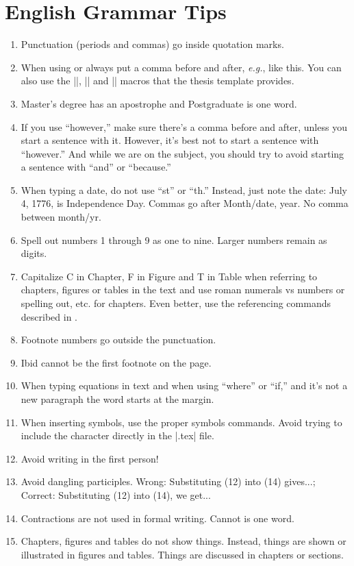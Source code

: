\section{English Grammar Tips}
\begin{enumerate}
\item Punctuation (periods and commas) go inside quotation marks. 
\item When using \ie \eg or \etc always put
  a comma before and after, \emph{e.g.}, like this. You can also use
  the |\ie|, |\eg| and |\etc| macros that the thesis template provides.
\item Master's degree has an apostrophe and Postgraduate is one word. 
\item If you use ``however,'' make sure there's a comma before and after,
  unless you start a sentence with it. However, it's best not to start a sentence
  with ``however.'' And while we are on the subject, you should try to avoid 
  starting a sentence with ``and'' or ``because.'' 
\item When typing a date, do not use ``st'' or ``th.'' Instead, just
  note the date: July 4, 1776, is Independence Day. Commas go 
  after Month/date, year. No comma between month/yr. 
\item Spell out numbers 1 through 9 as one to nine.  Larger numbers remain as digits.  
\item Capitalize C in Chapter, F in Figure and T in Table when
  referring to chapters, figures or tables in the text and use roman
  numerals vs numbers or spelling out, etc. for chapters. Even
  better, use the referencing commands described in .
\item Footnote numbers go outside the punctuation. 
\item Ibid cannot be the first footnote on the page.
\item When typing equations in text and when using ``where'' or ``if,''
  \etc and it's not a new paragraph the word starts at the margin.
\item When inserting symbols, use the proper symbols commands.  Avoid trying to
  include the character directly in the |.tex| file.
\item Avoid writing in the first person!
\item Avoid dangling participles.  Wrong: Substituting (12) into (14) gives...;
  Correct: Substituting (12) into (14), we get...
\item Contractions are not used in formal writing.  Cannot is one word.
\item Chapters, figures and tables do not show things.  Instead, things are shown
  or illustrated in figures and tables.  Things are discussed in chapters or sections.
\end{enumerate}

